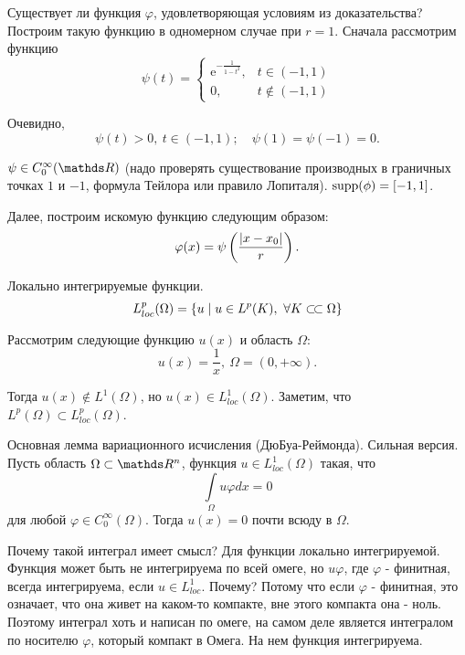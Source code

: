 \begin{note}
Существует ли функция $\varphi$, удовлетворяющая условиям из доказательства? Построим такую функцию в одномерном случае при $r = 1$. Сначала рассмотрим функцию
$$
    \psi(t) =
        \begin{cases} 
            \mathrm{e}^{-\frac{1}{1 - t^2}}, & t \in (-1, 1) \\
            0, & t \notin (-1, 1) 
        \end{cases}
$$

Очевидно, 
$$\psi(t) > 0, \ t \in (-1, 1); \quad \psi(1) = \psi(-1) = 0.$$ 

$\psi \in C_0^\infty(\real)$ (надо проверять существование производных в граничных точках $1$ и $-1$, формула Тейлора или правило Лопиталя). $\operatorname{supp}(\phi) = [-1, 1]$.

Далее, построим искомую функцию следующим образом:
$$\varphi(x) = \psi \left(\frac{\lvert x - x_0\rvert}{r}\right).$$
\end{note}

\begin{definition}{Локально интегрируемые функции.}
$$L_{loc}^p(\Omega) = \{u \mid u \in L^p(K),\ \forall K \ssubset \Omega\}$$
\end{definition}

\begin{example} Рассмотрим следующие функцию $u(x)$ и область $\Omega$:
$$u(x) = \frac{1}{x},\ \Omega = (0, +\infty).$$

Тогда $u(x) \notin L^1(\Omega)$, но $u(x) \in L_{loc}^1(\Omega)$. Заметим, что $L^p(\Omega) \subset L_{loc}^p(\Omega)$.
\end{example}

\begin{lemma}{Основная лемма вариационного исчисления (ДюБуа-Реймонда). Сильная версия.}
Пусть область $\Omega \subset \real^n$, функция $u \in L_{loc}^1(\Omega)$ такая, что 
$$\int \limits_{\Omega} u \varphi dx = 0$$ 
для любой $\varphi \in C_0^\infty(\Omega)$. Тогда $u(x) = 0$ почти всюду в $\Omega$.
\end{lemma}

Почему такой интеграл имеет смысл? Для функции локально интегрируемой. Функция может быть не интегрируема по
всей омеге, но $u\varphi$, где $\varphi$ - финитная, всегда интегрируема, если $u \in L_{loc}^1$. Почему?
Потому что если $\varphi$ - финитная, это означает, что она живет на каком-то компакте, вне этого компакта она
- ноль. Поэтому интеграл хоть и написан по омеге, на самом деле является интегралом по носителю $\varphi$,
который компакт в Омега. На нем функция интегрируема.


